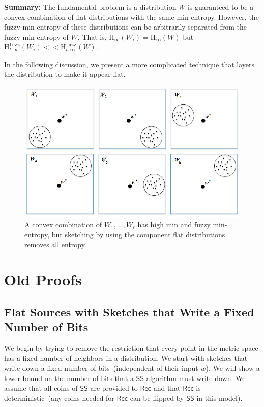 \documentclass[11pt]{article}
\newcommand{\class}[1]{{\ensuremath{\mathsf{#1}}}}
\newcommand{\sketch}{\ensuremath{\class{SS}}\xspace}
\newcommand{\rec}{\ensuremath{\class{Rec}}\xspace}
\newcommand{\Hoo}{\mathrm{H}_\infty}
\newcommand{\Hfuzz}{\mathrm{H}^{\mathtt{fuzz}}_{t,\infty}}
\begin{document}
\textbf{Summary:} The fundamental problem is a distribution $W$ is guaranteed to be a convex combination of flat distributions with the same min-entropy.  However, the fuzzy min-entropy of these distributions can be arbitrarily separated from the fuzzy min-entropy of $W$.  That is, $\Hoo(W_i) = \Hoo(W)$ but $\Hfuzz(W_i) << \Hfuzz(W)$.

In the following discussion, we present a more complicated technique that layers the distribution to make it appear flat.

\begin{figure}[t]

\centering
    \includegraphics[width=.9\textwidth]{convexCombExample.png}
    \caption{A convex combination of $W_1,..., W_\ell$ has high min and fuzzy min-entropy, but sketching by using the component flat distributions removes all entropy.}
\label{fig:convex comb}    
\end{figure}


\section{Old Proofs}
\subsection{Flat Sources with Sketches that Write a Fixed Number of Bits}
We begin by trying to remove the restriction that every point in the metric space has a fixed number of neighbors in a distribution.  We start with sketches that write down a fixed number of bits~(independent of their input $w$).   We will show a lower bound on the number of bits that a $\sketch$ algorithm must write down.  We assume that all coins of $\sketch$ are provided to $\rec$ and that $\rec$ is deterministic~(any coins needed for $\rec$ can be flipped by $\sketch$ in this model).
\end{document}
